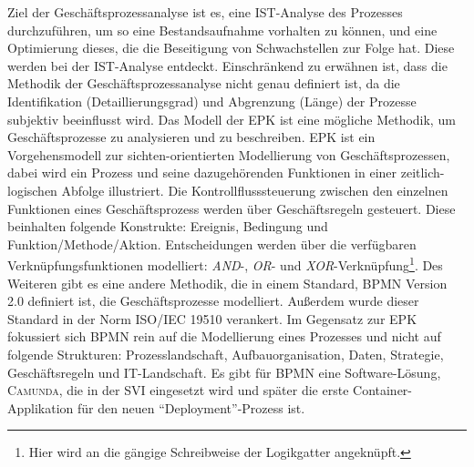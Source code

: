 Ziel der Geschäftsprozessanalyse ist es, eine IST-Analyse des Prozesses durchzuführen, um so eine Bestandsaufnahme vorhalten zu können, und eine Optimierung dieses, die die Beseitigung von Schwachstellen zur Folge hat. Diese werden bei der IST-Analyse entdeckt. Einschränkend zu erwähnen ist, dass die Methodik der Geschäftsprozessanalyse nicht genau definiert ist, da die Identifikation (Detaillierungsgrad) und Abgrenzung (Länge) der Prozesse subjektiv beeinflusst wird. Das Modell der \ac{EPK} ist eine mögliche Methodik, um Geschäftsprozesse zu analysieren und zu beschreiben.\autocite[vgl.][S.\,59]{staud_geschaftsprozessanalyse_2006} \ac{EPK} ist ein Vorgehensmodell zur sichten-orientierten Modellierung von Geschäftsprozessen, dabei wird ein Prozess und seine dazugehörenden Funktionen in einer zeitlich-logischen Abfolge illustriert.\autocite[vgl.][S.\,4]{scheer_objektorientierte_1997} Die Kontrollflusssteuerung zwischen den einzelnen Funktionen eines Geschäftsprozess werden über Geschäftsregeln gesteuert. Diese beinhalten folgende Konstrukte: Ereignis, Bedingung und Funktion/Methode/Aktion. Entscheidungen werden über die verfügbaren Verknüpfungsfunktionen modelliert:\autocite[vgl.][S.\,4]{scheer_objektorientierte_1997} \textit{AND}-, \textit{OR}- und \textit{XOR}-Verknüpfung\footnote{Hier wird an die gängige Schreibweise der Logikgatter angeknüpft.}. Des Weiteren gibt es eine andere Methodik, die in einem Standard, \ac{BPMN} Version 2.0 \autocite{object_management_group_omg_business_2011} definiert ist, die Geschäftsprozesse modelliert. Außerdem wurde dieser Standard in der Norm ISO/IEC 19510 verankert.\autocite{ict1_information_2020} Im Gegensatz zur \ac{EPK} fokussiert sich \ac{BPMN} rein auf die Modellierung eines Prozesses und nicht auf folgende Strukturen: Prozesslandschaft, Aufbauorganisation, Daten, Strategie, Geschäftsregeln und IT-Landschaft.\autocite[vgl.][S.\,28]{freund_praxishandbuch_2017} Es gibt für \ac{BPMN} eine Software-Lösung, \textsc{Camunda}, die in der \ac{SVI} eingesetzt wird und später die erste Container-Applikation für den neuen \enquote{Deployment}-Prozess ist.

